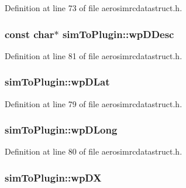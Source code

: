 Definition at line 73 of file aerosimrcdatastruct.\-h.

\hypertarget{group___aero_sim_r_c_ga65acd288880e17514c40557035b74fe3}{
\subsubsection[{wp\-D\-Desc}]{\setlength{\rightskip}{0pt plus 5cm}const char$\ast$ sim\-To\-Plugin\-::wp\-D\-Desc}}\label{group___aero_sim_r_c_ga65acd288880e17514c40557035b74fe3}


Definition at line 81 of file aerosimrcdatastruct.\-h.

\hypertarget{group___aero_sim_r_c_ga39ee4024f6f29cf4c19531ccf9f8122a}{
\subsubsection[{wp\-D\-Lat}]{ sim\-To\-Plugin\-::wp\-D\-Lat}}\label{group___aero_sim_r_c_ga39ee4024f6f29cf4c19531ccf9f8122a}


Definition at line 79 of file aerosimrcdatastruct.\-h.

\hypertarget{group___aero_sim_r_c_gad90f5c9d9b7ad07bee47b18838d0ddd8}{
\subsubsection[{wp\-D\-Long}]{ sim\-To\-Plugin\-::wp\-D\-Long}}\label{group___aero_sim_r_c_gad90f5c9d9b7ad07bee47b18838d0ddd8}


Definition at line 80 of file aerosimrcdatastruct.\-h.

\hypertarget{group___aero_sim_r_c_ga152da5c47fb8ddaa28e0e18015292750}{
\subsubsection[{wp\-D\-X}]{ sim\-To\-Plugin\-::wp\-D\-X}}\label{group___aero_sim_r_c_ga152da5c47fb8ddaa28e0e18015292750}


